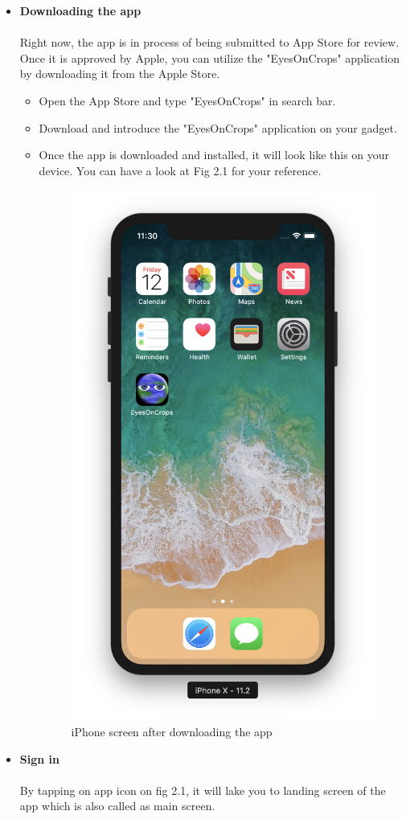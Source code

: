 \begin{itemize}
    \item \textbf{Downloading the app} \\ 
    \\
    Right now, the app is in process of being submitted to App Store for review. Once it is approved by Apple, you can utilize the "EyesOnCrops" application by downloading it from the Apple Store. 
    
    \begin{itemize}
        \item Open the App Store and type "EyesOnCrops" in search bar.
        \item Download and introduce the "EyesOnCrops" application on your gadget.
        \item Once the app is downloaded and installed, it will look like this on your device. You can have a look at Fig 2.1 for your reference.
        
        \begin{figure}[H]
            \centering
            \includegraphics[width=0.5\linewidth]{figures/ch2/app_icon_screen.png}
            \caption{\label{fig:app_icon_screen} iPhone screen after downloading the app}
        \end{figure}
    \end{itemize}
    
    \item \textbf{Sign in} \\
    \\
    By tapping on app icon on fig 2.1, it will lake you to landing screen of the app which is also called as main screen.
    

\end{itemize}
